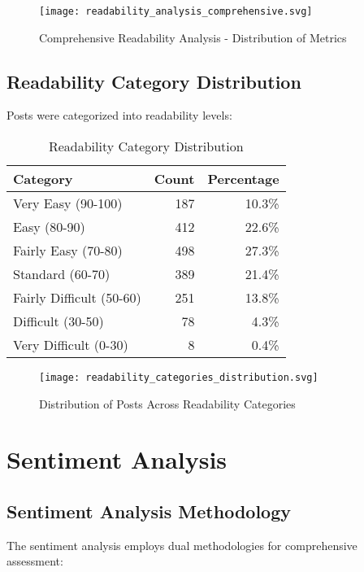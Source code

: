 \documentclass[12pt,a4paper]{article}
\begin{document}
\begin{figure}[H]
\centering
\texttt{[image: readability\_analysis\_comprehensive.svg]}
\caption{Comprehensive Readability Analysis - Distribution of Metrics}
\label{fig:readability_comprehensive}
\end{figure}

\subsection{Readability Category Distribution}

Posts were categorized into readability levels:

\begin{table}[H]
\centering
\caption{Readability Category Distribution}
\begin{tabular}{@{}lrr@{}}
\toprule
\textbf{Category} & \textbf{Count} & \textbf{Percentage} \\
\midrule
Very Easy (90-100) & 187 & 10.3\% \\
Easy (80-90) & 412 & 22.6\% \\
Fairly Easy (70-80) & 498 & 27.3\% \\
Standard (60-70) & 389 & 21.4\% \\
Fairly Difficult (50-60) & 251 & 13.8\% \\
Difficult (30-50) & 78 & 4.3\% \\
Very Difficult (0-30) & 8 & 0.4\% \\
\bottomrule
\end{tabular}
\end{table}

\begin{figure}[H]
\centering
\texttt{[image: readability\_categories\_distribution.svg]}
\caption{Distribution of Posts Across Readability Categories}
\label{fig:readability_categories}
\end{figure}

\section{Sentiment Analysis}

\subsection{Sentiment Analysis Methodology}

The sentiment analysis employs dual methodologies for comprehensive assessment:
\end{document}
